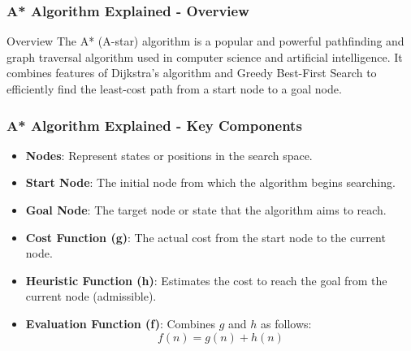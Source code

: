 \documentclass[aspectratio=169]{beamer}
\begin{document}
\begin{frame}[fragile]
    \frametitle{A* Algorithm Explained - Overview}
    \begin{block}{Overview}
        The A* (A-star) algorithm is a popular and powerful pathfinding and graph traversal algorithm used in computer science and artificial intelligence. It combines features of Dijkstra's algorithm and Greedy Best-First Search to efficiently find the least-cost path from a start node to a goal node.
    \end{block}
\end{frame}

\begin{frame}[fragile]
    \frametitle{A* Algorithm Explained - Key Components}
    \begin{itemize}
        \item \textbf{Nodes}: Represent states or positions in the search space.
        \item \textbf{Start Node}: The initial node from which the algorithm begins searching.
        \item \textbf{Goal Node}: The target node or state that the algorithm aims to reach.
        \item \textbf{Cost Function (g)}: The actual cost from the start node to the current node.
        \item \textbf{Heuristic Function (h)}: Estimates the cost to reach the goal from the current node (admissible).
        \item \textbf{Evaluation Function (f)}: Combines \( g \) and \( h \) as follows:
        \begin{equation}
            f(n) = g(n) + h(n)
        \end{equation}
    \end{itemize}
\end{frame}
\end{document}
